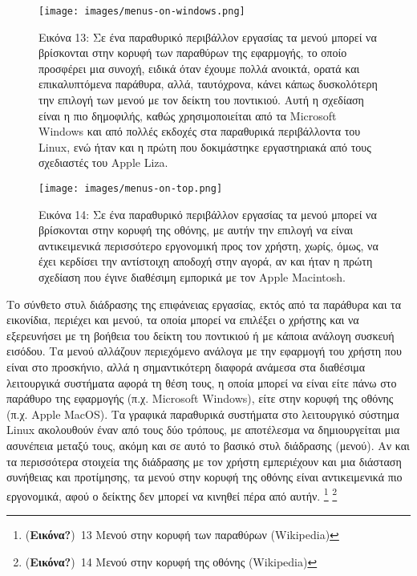 \documentclass[
]{article}
\begin{document}
\leavevmode{}%
\begin{figure}
\hypertarget{fig:menus-on-windows}{%
\centering
\texttt{[image: images/menus-on-windows.png]}
\caption{Εικόνα 13: Σε ένα παραθυρικό περιβάλλον εργασίας τα μενού
μπορεί να βρίσκονται στην κορυφή των παραθύρων της εφαρμογής, το οποίο
προσφέρει μια συνοχή, ειδικά όταν έχουμε πολλά ανοικτά, ορατά και
επικαλυπτόμενα παράθυρα, αλλά, ταυτόχρονα, κάνει κάπως δυσκολότερη την
επιλογή των μενού με τον δείκτη του ποντικιού. Αυτή η σχεδίαση είναι η
πιο δημοφιλής, καθώς χρησιμοποιείται από τα Microsoft Windows και από
πολλές εκδοχές στα παραθυρικά περιβάλλοντα του Linux, ενώ ήταν και η
πρώτη που δοκιμάστηκε εργαστηριακά από τους σχεδιαστές του Apple
Liza.}\label{fig:menus-on-windows}
}
\end{figure}

\leavevmode{}%
\begin{figure}
\hypertarget{fig:menus-on-top}{%
\centering
\texttt{[image: images/menus-on-top.png]}
\caption{Εικόνα 14: Σε ένα παραθυρικό περιβάλλον εργασίας τα μενού
μπορεί να βρίσκονται στην κορυφή της οθόνης, με αυτήν την επιλογή να
είναι αντικειμενικά περισσότερο εργονομική προς τον χρήστη, χωρίς, όμως,
να έχει κερδίσει την αντίστοιχη αποδοχή στην αγορά, αν και ήταν η πρώτη
σχεδίαση που έγινε διαθέσιμη εμπορικά με τον Apple
Macintosh.}\label{fig:menus-on-top}
}
\end{figure}

Το σύνθετο στυλ διάδρασης της επιφάνειας εργασίας, εκτός από τα παράθυρα
και τα εικονίδια, περιέχει και μενού, τα οποία μπορεί να επιλέξει ο
χρήστης και να εξερευνήσει με τη βοήθεια του δείκτη του ποντικιού ή με
κάποια ανάλογη συσκευή εισόδου. Τα μενού αλλάζουν περιεχόμενο ανάλογα με
την εφαρμογή του χρήστη που είναι στο προσκήνιο, αλλά η σημαντικότερη
διαφορά ανάμεσα στα διαθέσιμα λειτουργικά συστήματα αφορά τη θέση τους,
η οποία μπορεί να είναι είτε πάνω στο παράθυρο της εφαρμογής (π.χ.
Microsoft Windows), είτε στην κορυφή της οθόνης (π.χ. Apple MacOS). Τα
γραφικά παραθυρικά συστήματα στο λειτουργικό σύστημα Linux ακολουθούν
έναν από τους δύο τρόπους, με αποτέλεσμα να δημιουργείται μια ασυνέπεια
μεταξύ τους, ακόμη και σε αυτό το βασικό στυλ διάδρασης (μενού). Αν και
τα περισσότερα στοιχεία της διάδρασης με τον χρήστη εμπεριέχουν και μια
διάσταση συνήθειας και προτίμησης, τα μενού στην κορυφή της οθόνης είναι
αντικειμενικά πιο εργονομικά, αφού ο δείκτης δεν μπορεί να κινηθεί πέρα
από αυτήν. \footnote{(\textbf{Εικόνα?})~13 Μενού στην κορυφή των
  παραθύρων (Wikipedia)} \footnote{(\textbf{Εικόνα?})~14 Μενού στην
  κορυφή της οθόνης (Wikipedia)}
\end{document}
